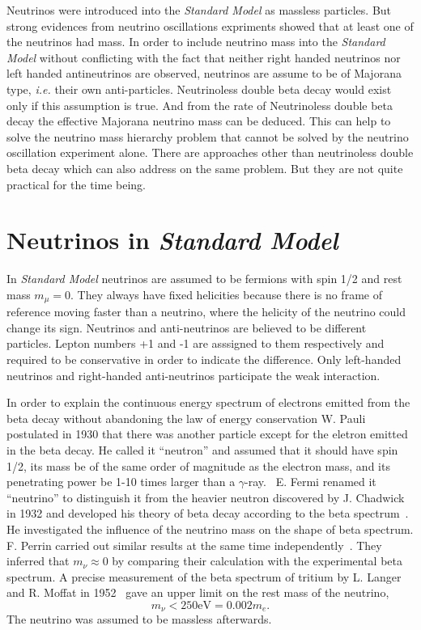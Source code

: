 Neutrinos were introduced into the \emph{Standard Model} as massless
particles. But strong evidences from neutrino oscillations expriments
showed that at least one of the neutrinos had mass. In order to
include neutrino mass into the \emph{Standard Model} without
conflicting with the fact that neither right handed neutrinos nor left
handed antineutrinos are observed, neutrinos are assume to be of
Majorana type, \textit{i.e.} their own anti-particles. Neutrinoless
double beta decay would exist only if this assumption is true. And
from the rate of Neutrinoless double beta decay the effective Majorana
neutrino mass can be deduced. This can help to solve the neutrino mass
hierarchy problem that cannot be solved by the neutrino oscillation
experiment alone. There are approaches other than neutrinoless double
beta decay which can also address on the same problem. But they are
not quite practical for the time being.

\section{Neutrinos in \emph{Standard Model}}
\label{sec:sm}
In \emph{Standard Model} neutrinos are assumed to be fermions with
spin 1/2 and rest mass $m_\mu=0$. They always have fixed helicities
because there is no frame of reference moving faster than a neutrino,
where the helicity of the neutrino could change its sign. Neutrinos
and anti-neutrinos are believed to be different particles. Lepton
numbers +1 and -1 are asssigned to them respectively and required to
be conservative in order to indicate the difference. Only left-handed
neutrinos and right-handed anti-neutrinos participate the weak
interaction.

In order to explain the continuous energy spectrum of electrons
emitted from the beta decay without abandoning the law of energy
conservation W. Pauli postulated in 1930 that there was another
particle except for the eletron emitted in the beta decay. He called
it ``neutron'' and assumed that it should have spin 1/2, its mass be
of the same order of magnitude as the electron mass, and its
penetrating power be 1-10 times larger than a
$\gamma$-ray.~\cite{Pau30} E. Fermi renamed it ``neutrino'' to
distinguish it from the heavier neutron discovered by J. Chadwick in
1932 and developed his theory of beta decay according to the beta
spectrum~\cite{Fer33,Fer34}. He investigated the influence of the
neutrino mass on the shape of beta spectrum. F. Perrin carried out
similar results at the same time independently~\cite{Per33}. They
inferred that $m_\nu \approx 0$ by comparing their calculation with
the experimental beta spectrum. A precise measurement of the beta
spectrum of tritium by L. Langer and R. Moffat in 1952~\cite{Lan52}
gave an upper limit on the rest mass of the neutrino,
$$m_\nu < 250 \mbox{eV} = 0.002m_e.$$
The neutrino was assumed to be massless afterwards.

